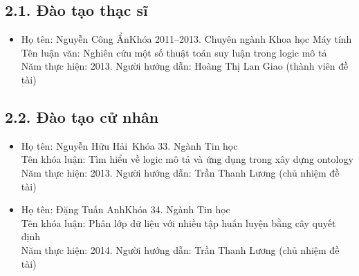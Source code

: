 \subsection*{2.1. Đào tạo thạc sĩ}
\begin{small}
	\begin{itemize}
		\item Họ tên: Nguyễn Công Ẩn\qquad\;Khóa 2011--2013. Chuyên ngành Khoa học Máy tính\\	
		Tên luận văn: Nghiên cứu một số thuật toán suy luận trong logic mô tả\\	
		Năm thực hiện: 2013. Người hướng dẫn: Hoàng Thị Lan Giao (thành viên đề tài)
	\end{itemize}
\end{small}

\subsection*{2.2. Đào tạo cử nhân}
\begin{small}
	\begin{itemize}
		\item Họ tên: Nguyễn Hữu Hải\qquad\, Khóa 33. Ngành Tin học\\	
		Tên khóa luận: Tìm hiểu về logic mô tả và ứng dụng trong xây dựng ontology\\	
		Năm thực hiện: 2013. Người hướng dẫn: Trần Thanh Lương (chủ nhiệm đề tài)
		
		\item Họ tên: Đặng Tuấn Anh\qquad\;\;\;Khóa 34. Ngành Tin học\\	
		Tên khóa luận: Phân lớp dữ liệu với nhiều tập huấn luyện bằng cây quyết định\\	
		Năm thực hiện: 2014. Người hướng dẫn: Trần Thanh Lương (chủ nhiệm đề tài)
	\end{itemize}
\end{small}